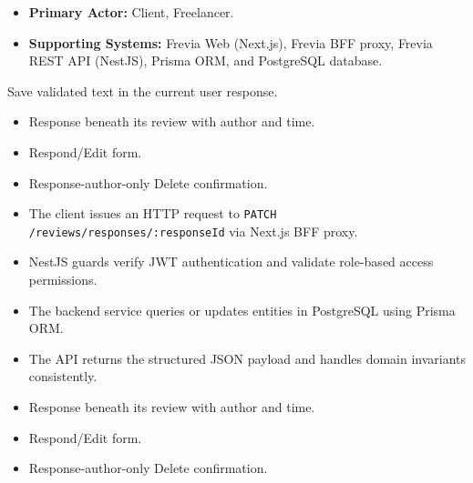 
\begin{itemize}[leftmargin=1.6em,topsep=3pt,itemsep=2pt,parsep=0pt,label=$\bullet$]
    \item \textbf{Primary Actor:} Client, Freelancer.
    \item \textbf{Supporting Systems:} Frevia Web (Next.js), Frevia BFF proxy, Frevia REST API (NestJS), Prisma ORM, and PostgreSQL database.
\end{itemize}

\noindent Save validated text in the current user response.

\begin{itemize}[leftmargin=1.6em,topsep=3pt,itemsep=2pt,parsep=0pt,label=$\bullet$]
    \item Response beneath its review with author and time.
    \item Respond/Edit form.
    \item Response-author-only Delete confirmation.
\end{itemize}

\begin{itemize}[leftmargin=1.6em,topsep=3pt,itemsep=2pt,parsep=0pt,label=$\bullet$]
    \item The client issues an HTTP request to \texttt{PATCH /\allowbreak{}reviews/\allowbreak{}responses/\allowbreak{}:\allowbreak{}responseId} via Next.js BFF proxy.
    \item NestJS guards verify JWT authentication and validate role-based access permissions.
    \item The backend service queries or updates entities in PostgreSQL using Prisma ORM.
    \item The API returns the structured JSON payload and handles domain invariants consistently.
\end{itemize}

\begin{itemize}[leftmargin=1.6em,topsep=3pt,itemsep=2pt,parsep=0pt,label=$\bullet$]
    \item Response beneath its review with author and time.
    \item Respond/Edit form.
    \item Response-author-only Delete confirmation.
\end{itemize}

